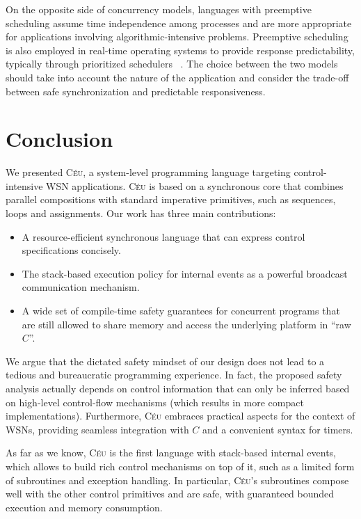 \documentclass[letterpaper]{sig-alternate}
\newcommand{\CEU}{\textsc{C\'{e}u}\xspace}
\begin{document}
On the opposite side of concurrency models, languages with preemptive 
scheduling assume time independence among processes and are more appropriate 
for applications involving algorithmic-intensive problems.
%
Preemptive scheduling is also employed in real-time operating systems to 
provide response predictability, typically through prioritized schedulers
~\cite{wsn.mantisos,wsn.oses,freertos,wsn.tosthreads}.
%
The choice between the two models should take into account the nature of the 
application and consider the trade-off between safe synchronization and 
predictable responsiveness.

\section{Conclusion}
\label{sec.conclusion}


We presented \CEU, a system-level programming language targeting 
control-intensive WSN applications.
\CEU is based on a synchronous core that combines parallel compositions with 
standard imperative primitives, such as sequences, loops and assignments.
%
Our work has three main contributions:
%
\begin{itemize}
%
\item A resource-efficient synchronous language that can express control 
      specifications concisely.
%
\item The stack-based execution policy for internal events as a powerful 
      broadcast communication mechanism.
%
\item A wide set of compile-time safety guarantees for concurrent programs that 
      are still allowed to share memory and access the underlying platform in 
``raw $C$''.
%
\end{itemize}
%
We argue that the dictated safety mindset of our design does not lead to a 
tedious and bureaucratic programming experience.
%
In fact, the proposed safety analysis actually depends on control information 
that can only be inferred based on high-level control-flow mechanisms (which 
results in more compact implementations).
%
Furthermore, \CEU embraces practical aspects for the context of WSNs, providing 
seamless integration with $C$ and a convenient syntax for timers.
%

As far as we know, \CEU is the first language with stack-based internal events, 
which allows to build rich control mechanisms on top of it, such as a limited 
form of subroutines and exception handling.
%
In particular, \CEU's subroutines compose well with the other control 
primitives and are safe, with guaranteed bounded execution and memory 
consumption.
\end{document}
